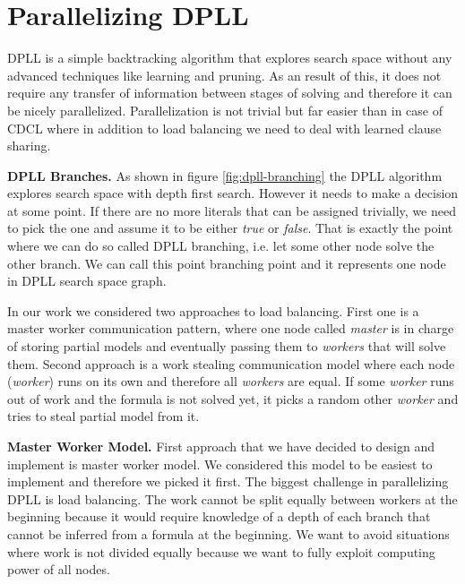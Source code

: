 \documentclass[letterpaper]{article}
\newcommand{\mypar}[1]{{\bf #1.}}
\begin{document}
\section{Parallelizing DPLL}\label{sec:parallel_dpll}

DPLL is a simple backtracking algorithm that explores search space without any advanced techniques like learning and pruning. As an result of this, it does not require any transfer of information between stages of solving and therefore it can be nicely parallelized. Parallelization is not trivial but far easier than in case of CDCL where in addition to load balancing we need to deal with learned clause sharing. 


\mypar{DPLL Branches}
As shown in figure \ref{fig:dpll-branching} the DPLL algorithm explores search space with depth first search. However it needs to make a decision at some point. If there are no more literals that can be assigned trivially, we need to pick the one and assume it to be either \textit{true} or \textit{false}. That is exactly the point where we can do so called DPLL branching, i.e. let some other node solve the other branch. We can call this point branching point and it represents one node in DPLL search space graph. 

In our work we considered two approaches to load balancing. 
First one is a master worker communication pattern, where one node called \textit{master} is in charge of storing partial models and eventually passing them to \textit{workers} that will solve them.
Second approach is a work stealing communication model where each node (\textit{worker}) runs on its own and therefore all \textit{workers} are equal. If some \textit{worker} runs out of work and the formula is not solved yet, it picks a random other \textit{worker} and tries to steal partial model from it.

\mypar{Master Worker Model}
First approach that we have decided to design and implement is master worker model. We considered this model to be easiest to implement and therefore we picked it first. The biggest challenge in parallelizing DPLL is load balancing. The work cannot be split equally between workers at the beginning because it would require knowledge of a depth of each branch that cannot be inferred from a formula at the beginning. We want to avoid situations where work is not divided equally because we want to fully exploit computing power of all nodes. 
\end{document}
